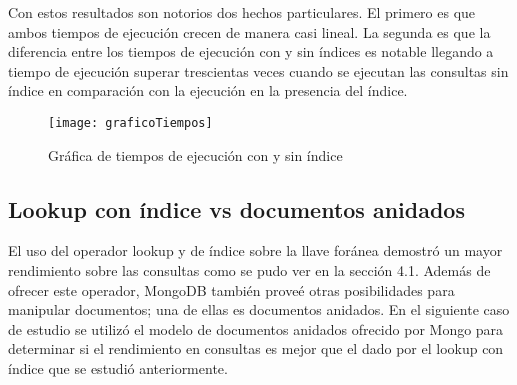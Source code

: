 \documentclass[conference,compsoc]{sty/IEEEtran}
\begin{document}
Con estos resultados son notorios dos hechos particulares. El primero es que ambos tiempos de ejecución crecen de manera casi lineal. %
La segunda es que la diferencia entre los tiempos de ejecución con y sin índices es notable llegando a tiempo de ejecución superar trescientas veces cuando se ejecutan las consultas sin índice en comparación con la ejecución en la presencia del índice. %


\begin{figure}
\begin{center}
\texttt{[image: graficoTiempos]}
\end{center}
\caption{Gráfica de tiempos de ejecución con y sin índice} 
\label{fig:conysin_indice}
\end{figure}

\subsection{Lookup con índice vs documentos anidados}


El uso del operador lookup y de índice sobre la llave foránea demostró un mayor rendimiento sobre las consultas como se pudo ver en la sección 4.1. Además de ofrecer este operador, MongoDB también proveé otras posibilidades para manipular documentos; una de ellas es documentos anidados. En el siguiente caso de estudio se utilizó el modelo de documentos anidados ofrecido por Mongo para determinar si el rendimiento en consultas es mejor que el dado por el lookup con índice que se estudió anteriormente. 
\end{document}
